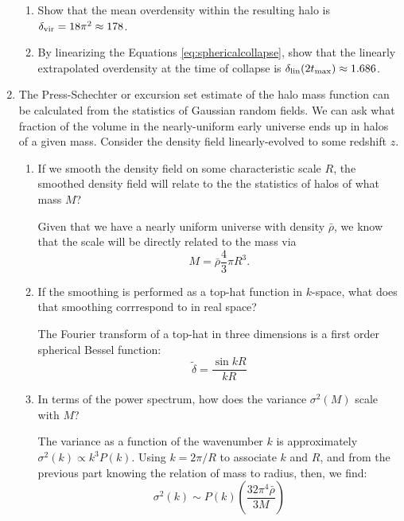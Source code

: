 \begin{enumerate}
\begin{enumerate}
\item Show that the mean overdensity within the resulting halo  is
$\delta_{\rm vir} = 18\pi^2 \approx 178$. 
\item By linearizing the Equations \ref{eq:sphericalcollapse}, show
that the linearly extrapolated overdensity at the time of collapse is
$\delta_{\rm lin}(2 t_{\rm max}) \approx 1.686$.
\end{enumerate}
\item The Press-Schechter or excursion set estimate of the halo mass
function can be calculated from the statistics of Gaussian random
fields. We can ask what fraction of the volume in the nearly-uniform
early universe ends up in halos of a given mass.  Consider the density
field linearly-evolved to some redshift $z$.
\begin{enumerate}
\item If we smooth the density field on some characteristic scale $R$,
the smoothed density field will relate to the the statistics of halos
of what mass $M$?
\begin{answer}
    Given that we have a nearly uniform universe with density $\bar{\rho}$, we know that the scale will be directly related to the mass via 
    \begin{equation}
        M=\bar{\rho} \frac{4}{3}\pi R^3.
    \end{equation}
\end{answer}
\item If the smoothing is performed as a top-hat function in
$k$-space, what does that smoothing corrrespond to in real space?
\begin{answer}
    The Fourier transform of a top-hat in three dimensions is a first order spherical Bessel function:
\begin{equation}
\tilde \delta = \frac{\sin k R}{kR}
\end{equation}
\end{answer}
\item In terms of the power spectrum, how does the variance
$\sigma^2(M)$ scale with $M$?
\begin{answer}
The variance as a function of the wavenumber $k$ is approximately
$\sigma^2(k) \propto k^3 P(k)$. Using $k=2\pi/R$ to associate $k$ and
$R$, and from the previous part knowing the relation of mass to
radius, then, we find:
\begin{equation}
    \sigma^2(k) \sim P(k)
    \left(\frac{32\pi^4\bar{\rho}}{3M}\right)
\end{equation}

\end{answer}
\end{enumerate}
\end{enumerate}
